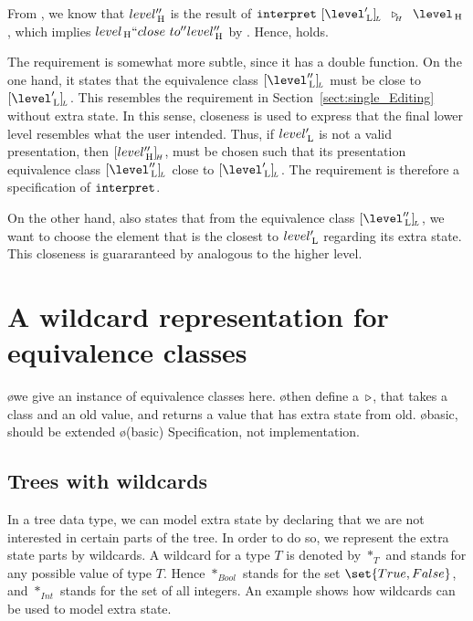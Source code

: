 From , we know that $level''_{\, \mathrm H}$ is the result of  $\interpret~ \eqcl{\level'\L}{L}  ~\reuze{H}~   \level\H$, which implies $level_{\, \mathrm H} ``close~to'' level''_{\, \mathrm H}$ by . Hence,  holds.

The  requirement is somewhat more subtle, since it has a double function. On the one hand, it states that the equivalence class $\eqcl{\level''\L}{L}$ must be close to $\eqcl{\level'\L}{L}$. This resembles the  requirement in Section~\ref{sect:single_Editing} without extra state. In this sense, closeness is used to express that the final lower level resembles what the user intended. Thus, if $level'_{\, \mathrm L}$ is not a valid presentation, then $[{level''_{\, \mathrm H}}]_{{\!_{H}}}$, must be chosen such that its presentation equivalence class $\eqcl{\level''\L}{L}$ close to $\eqcl{\level'\L}{L}$. The requirement is therefore a specification of ${\tt interpret}$.


On the other hand,  also states that from the equivalence class $\eqcl{\level''\L}{L}$,
 we want to choose the element that is the closest to $level'_{\, \mathrm L}$ regarding its extra state. This closeness is guararanteed by  analogous to the higher level.



%																
%																
%																
\section{A wildcard representation for equivalence classes} \label{sect:wildcardEq}

\bl
\o we give an instance of equivalence classes here.
\o then define a~$\triangleright$, that takes a class and an old value, and returns a value that has extra state from old.
\o basic, should be extended
\o (basic) Specification, not implementation. 
\el

%

\fromHere

\subsection{Trees with wildcards}
In a tree data type, we can model extra state by declaring that we are not interested in certain parts of the tree. In order to do so, we represent the extra state parts by wildcards. A wildcard for a type $T$ is denoted by $*_T$ and stands for any possible value of type $T$. Hence $*_{Bool}$ stands for the set $\set{True, False}$, and $*_{Int}$ stands for the set of all integers. An example shows how wildcards can be used to model extra state.

